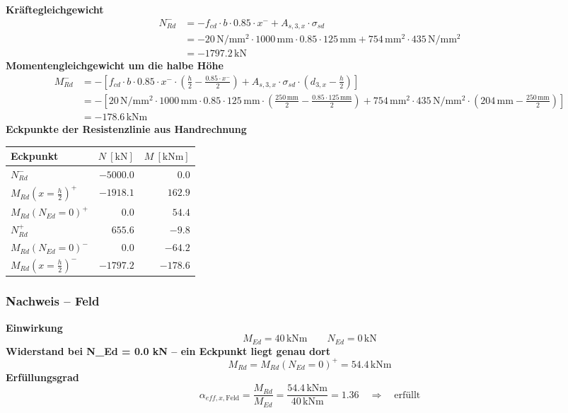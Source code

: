 \documentclass[11pt,a4paper]{article}
\begin{document}
\noindent\textbf{Kräftegleichgewicht}
\begin{equation*}
\begin{aligned}
  N_{Rd}^{-} &= -f_{cd} \cdot b \cdot 0.85 \cdot x^{-} + A_{s,3,x} \cdot \sigma_{sd} \\
  &= -20\,\mathrm{N}/\mathrm{mm}^{2} \cdot 1000\,\mathrm{mm} \cdot 0.85 \cdot 125\,\mathrm{mm} + 754\,\mathrm{mm}^{2} \cdot 435\,\mathrm{N}/\mathrm{mm}^{2} \\
  &= -1797.2\,\mathrm{kN}
\end{aligned}
\end{equation*}
\noindent\textbf{Momentengleichgewicht um die halbe Höhe}
\begin{equation*}
\begin{aligned}
  M_{Rd}^{-} &= -\left[f_{cd} \cdot b \cdot 0.85 \cdot x^{-} \cdot \left(\tfrac{h}{2} - \tfrac{0.85 \cdot x^{-}}{2}\right) + A_{s,3,x} \cdot \sigma_{sd} \cdot \left(d_{3,x} - \tfrac{h}{2}\right)\right] \\
  &= -\left[20\,\mathrm{N}/\mathrm{mm}^{2} \cdot 1000\,\mathrm{mm} \cdot 0.85 \cdot 125\,\mathrm{mm} \cdot \left(\tfrac{250\,\mathrm{mm}}{2} - \tfrac{0.85 \cdot 125\,\mathrm{mm}}{2}\right) + 754\,\mathrm{mm}^{2} \cdot 435\,\mathrm{N}/\mathrm{mm}^{2} \cdot \left(204\,\mathrm{mm} - \tfrac{250\,\mathrm{mm}}{2}\right)\right] \\
  &= -178.6\,\mathrm{kNm}
\end{aligned}
\end{equation*}
\noindent\textbf{Eckpunkte der Resistenzlinie aus Handrechnung}
\begin{longtable}{lrr}
\hline
Eckpunkt & $N\ [\mathrm{kN}]$ & $M\ [\mathrm{kNm}]$ \\
\hline
\endhead
$N_{Rd}^{-}$ & $-5000.0$ & $0.0$ \\
$M_{Rd}(x=\tfrac{h}{2})^{+}$ & $-1918.1$ & $162.9$ \\
$M_{Rd}(N_{Ed}=0)^{+}$ & $0.0$ & $54.4$ \\
$N_{Rd}^{+}$ & $655.6$ & $-9.8$ \\
$M_{Rd}(N_{Ed}=0)^{-}$ & $0.0$ & $-64.2$ \\
$M_{Rd}(x=\tfrac{h}{2})^{-}$ & $-1797.2$ & $-178.6$ \\
\hline
\end{longtable}
\subsubsection{Nachweis – Feld}
\noindent\textbf{Einwirkung}
\begin{equation*}
M_{Ed} = 40\,\mathrm{kNm} \qquad N_{Ed} = 0\,\mathrm{kN}
\end{equation*}
\noindent\textbf{Widerstand bei N\_Ed = 0.0 kN – ein Eckpunkt liegt genau dort}
\begin{equation*}
M_{Rd} = M_{Rd}(N_{Ed}=0)^{+} = 54.4\,\mathrm{kNm}
\end{equation*}
\noindent\textbf{Erfüllungsgrad}
\begin{equation*}
\alpha_{eff,x,\text{Feld}} = \frac{M_{Rd}}{M_{Ed}} = \frac{54.4\,\mathrm{kNm}}{40\,\mathrm{kNm}} = 1.36 \quad \Rightarrow \quad \text{erfüllt}
\end{equation*}
\end{document}
